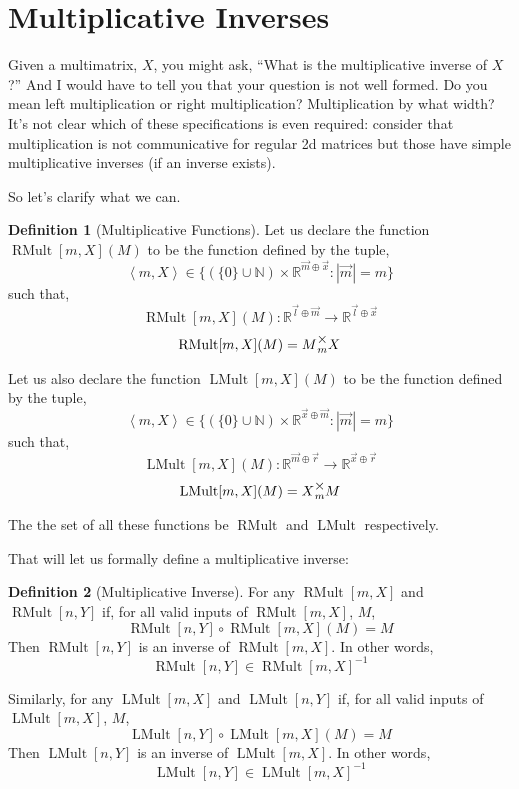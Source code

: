 \documentclass[12pt]{book}
\theoremstyle{plain}
\theoremstyle{definition}
\newtheorem{definition}{Definition}[chapter]
\theoremstyle{ppart}
\theoremstyle{case}
\theoremstyle{solution}
\DeclareMathOperator{\RMult}{RMult}
\DeclareMathOperator{\LMult}{LMult}
\newcommand{\mmult}[1]{\text{\raisebox{1ex}{$\underset{#1}{\times}$}}}
\newcommand{\shape}[1]{\left|#1\right|}
\begin{document}
\section{Multiplicative Inverses}

Given a multimatrix, $X$, you might ask, ``What is the multiplicative inverse of $X$?''
And I would have to tell you that your question is not well formed. Do you mean left multiplication
or right multiplication? Multiplication by what width? It's not clear which of these specifications
is even required: consider that multiplication is not communicative for regular 2d matrices but
those have simple multiplicative inverses (if an inverse exists). 

So let's clarify what we can.

\begin{definition}[Multiplicative Functions]
Let us declare the function $\RMult[m,X](M)$ to be the function defined 
by the tuple,
\[ \left<m,X\right> \in \{  (\{0\} \cup \mathbb{N}) \times \mathbb{R}^{\vec{m} \oplus \vec{x}}  :  \shape{\vec{m}} = m \} \]
such that,
\[ \RMult[m,X](M) : \mathbb{R}^{\vec{l} \oplus \vec{m}} \to \mathbb{R}^{\vec{l} \oplus \vec{x}} \]
\[ \RMult[m,X](M) = M \mmult{m} X \]

Let us also declare the function $\LMult[m,X](M)$ to be the function defined 
by the tuple,
\[ \left<m,X\right> \in \{  (\{0\} \cup \mathbb{N}) \times \mathbb{R}^{\vec{x} \oplus \vec{m}}  :  \shape{\vec{m}} = m \} \]
such that,
\[ \LMult[m,X](M) : \mathbb{R}^{\vec{m} \oplus \vec{r}} \to \mathbb{R}^{\vec{x} \oplus \vec{r}} \]
\[ \LMult[m,X](M) = X \mmult{m} M \]

The the set of all these functions be $\RMult$ and $\LMult$ respectively.
\end{definition}

That will let us formally define a multiplicative inverse:

\begin{definition}[Multiplicative Inverse]
For any $\RMult[m,X]$ and $\RMult[n,Y]$ if, for all valid inputs of $\RMult[m,X]$, $M$,
\[ \RMult[n,Y] \circ \RMult[m,X] (M) = M \]
Then $\RMult[n,Y]$ is an inverse of $\RMult[m,X]$. In other words,
\[ \RMult[n,Y] \in \RMult[m,X]^{-1} \]

Similarly, for any $\LMult[m,X]$ and $\LMult[n,Y]$ if, for all valid inputs of $\LMult[m,X]$, $M$,
\[ \LMult[n,Y] \circ \LMult[m,X] (M) = M \]
Then $\LMult[n,Y]$ is an inverse of $\LMult[m,X]$. In other words,
\[ \LMult[n,Y] \in \LMult[m,X]^{-1} \]
\end{definition}
\end{document}
